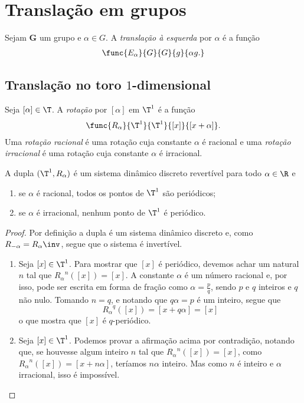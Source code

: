 \section{Translação em grupos}

\begin{definition}
Sejam $\bm G$ um grupo e $\alpha \in G$. A \emph{translação à esquerda} por $\alpha$ é a função
	\begin{align*}
	\func{E_\alpha}{G}{G}{g}{\alpha g.}
	\end{align*}
\end{definition}

\subsection{Translação no toro $1$-dimensional}

\begin{definition}
Seja $[\alpha] \in \T$. A \emph{rotação} por $[\alpha]$ em $\T^1$ é a função
	\begin{align*}
	\func{R_\alpha}{\T^1}{\T^1}{[x]}{[x+\alpha]}.
	\end{align*}
Uma \emph{rotação racional} é uma rotação cuja constante $\alpha$ é racional e uma \emph{rotação irracional} é uma rotação cuja constante $\alpha$ é irracional.
\end{definition}

\begin{proposition}
A dupla $(\T^1,R_\alpha)$ é um sistema dinâmico discreto revertível para todo $\alpha \in \R$ e
	\begin{enumerate}
	\item se $\alpha$ é racional, todos os pontos de $\T^1$ são periódicos;
	\item se $\alpha$ é irracional, nenhum ponto de $\T^1$ é periódico.
	\end{enumerate}
\end{proposition}
\begin{proof}
Por definição a dupla é um sistema dinâmico discreto e, como $R_{-\alpha}={R_\alpha}\inv$, segue que o sistema é invertível.
	\begin{enumerate}
	\item Seja $[x] \in \T^1$. Para mostrar que $[x]$ é periódico, devemos achar um natural $n$ tal que ${R_\alpha}^n([x]) = [x]$. A constante $\alpha$ é um número racional e, por isso, pode ser escrita em forma de fração como $\alpha = \frac{p}{q}$, sendo $p$ e $q$ inteiros e $q$ não nulo. Tomando $n = q$, e notando que $q\alpha=p$ é um inteiro, segue que
	\begin{equation*}
	{R_\alpha}^q([x]) = [x+q\alpha] = [x]
	\end{equation*}
o que mostra que $[x]$ é $q$-periódico.

	\item Seja $[x] \in \T^1$. Podemos provar a afirmação acima por contradição, notando que, se houvesse algum inteiro $n$ tal que ${R_\alpha}^n([x]) = [x]$, como ${R_\alpha}^n([x]) = [x + n\alpha]$, teríamos $n\alpha$ inteiro. Mas como $n$ é inteiro e $\alpha$ irracional, isso é impossível.
	\qedhere
	\end{enumerate}
\end{proof}


